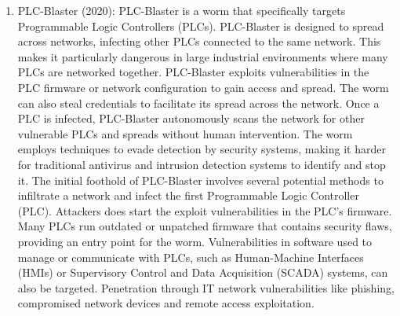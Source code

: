 \begin{enumerate}
    
    \item PLC-Blaster (2020): PLC-Blaster is a worm that specifically targets Programmable Logic Controllers (PLCs). PLC-Blaster is designed to spread across networks, infecting other PLCs connected to the same network. This makes it particularly dangerous in large industrial environments where many PLCs are networked together. PLC-Blaster exploits vulnerabilities in the PLC firmware or network configuration to gain access and spread. The worm can also steal credentials to facilitate its spread across the network. Once a PLC is infected, PLC-Blaster autonomously scans the network for other vulnerable PLCs and spreads without human intervention. The worm employs techniques to evade detection by security systems, making it harder for traditional antivirus and intrusion detection systems to identify and stop it. The initial foothold of PLC-Blaster involves several potential methods to infiltrate a network and infect the first Programmable Logic Controller (PLC). Attackers does start the  exploit vulnerabilities in the PLC’s firmware. Many PLCs run outdated or unpatched firmware that contains security flaws, providing an entry point for the worm. Vulnerabilities in software used to manage or communicate with PLCs, such as Human-Machine Interfaces (HMIs) or Supervisory Control and Data Acquisition (SCADA) systems, can also be targeted. Penetration through IT network vulnerabilities like phishing, compromised network devices and remote access exploitation.  
\end{enumerate}


